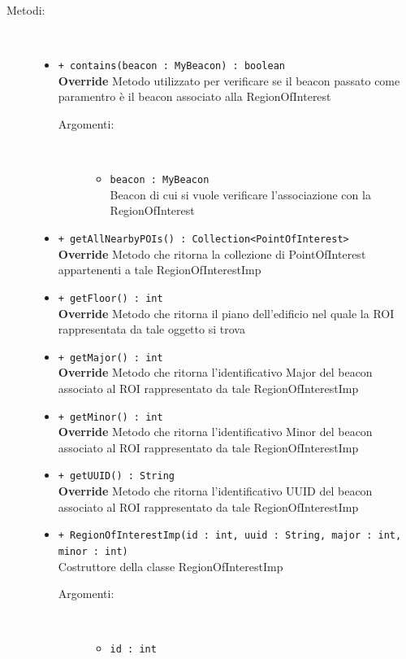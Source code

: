 \documentclass[../DefinizioneDiProdotto.tex]{subfiles}
\begin{document}
\begin{description}
\begin{itemize}
\end{itemize}
\item[Metodi:] \
\begin{itemize}
\item \texttt{+ contains(beacon : MyBeacon) : boolean}\\
\textbf{Override} Metodo utilizzato per verificare se il beacon passato come paramentro è il beacon associato alla RegionOfInterest
 \begin{description}
\item[Argomenti:] \
\begin{itemize}
\item \texttt{beacon : MyBeacon}\\
Beacon di cui si vuole verificare l'associazione con la RegionOfInterest\end{itemize}
\end{description}
\item \texttt{+ getAllNearbyPOIs() : Collection<PointOfInterest>}\\
\textbf{Override} Metodo che ritorna la collezione di PointOfInterest appartenenti a tale RegionOfInterestImp
 \item \texttt{+ getFloor() : int}\\
\textbf{Override} Metodo che ritorna il piano dell'edificio nel quale la ROI rappresentata da tale oggetto si trova
 \item \texttt{+ getMajor() : int}\\
\textbf{Override} Metodo che ritorna l'identificativo Major del beacon associato al ROI rappresentato da tale RegionOfInterestImp
 \item \texttt{+ getMinor() : int}\\
\textbf{Override} Metodo che ritorna l'identificativo Minor del beacon associato al ROI rappresentato da tale RegionOfInterestImp
 \item \texttt{+ getUUID() : String}\\
\textbf{Override} Metodo che ritorna l'identificativo UUID del beacon associato al ROI rappresentato da tale RegionOfInterestImp
 \item \texttt{+ RegionOfInterestImp(id  : int, uuid : String, major : int, minor : int)}\\
Costruttore della classe RegionOfInterestImp
 \begin{description}
\item[Argomenti:] \
\begin{itemize}
\item \texttt{id  : int}\\

\end{itemize}
\end{description}
\end{itemize}
\end{description}
\end{document}
